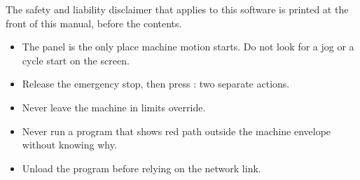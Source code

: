 The safety and liability disclaimer that applies to this software is printed at the front
of this manual, before the contents.

\begin{safetybox}
  \begin{itemize}
    \item The panel is the only place machine motion starts. Do not look for a jog or a
          cycle start on the screen.
    \item Release the emergency stop, then press : two separate actions.
    \item Never leave the machine in limits override.
    \item Never run a program that shows red path outside the machine envelope without
          knowing why.
    \item Unload the program before relying on the network link.
  \end{itemize}
\end{safetybox}
